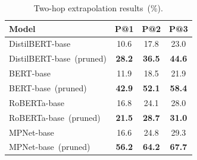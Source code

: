\begin{table}[th!]
	\centering
	\scriptsize
	\begin{tabular}{l|ccc}
		\toprule
		\textbf{Model} &  \textbf{P@1} &  \textbf{P@2} &  \textbf{P@3}\\
		\midrule
		DistilBERT-base &10.6 &17.8 &23.0\\
		DistilBERT-base~(pruned) &\textbf{28.2}  &\textbf{36.5} &\textbf{44.6} \\
		\midrule
		BERT-base &11.9  &18.5 &21.9\\
		BERT-base~(pruned) &\textbf{42.9}  &\textbf{52.1} &\textbf{58.4} \\
		\midrule
		RoBERTa-base &16.8 &24.1 &28.0  \\
		RoBERTa-base~(pruned) &\textbf{21.5}  &\textbf{28.7} &\textbf{31.0}\\
		\midrule
		MPNet-base &16.6 &24.8 &29.3 \\
		MPNet-base~(pruned) &\textbf{56.2} &\textbf{64.2} &\textbf{67.7} \\
		\bottomrule
	\end{tabular}
	\caption{Two-hop extrapolation results~(\%).}
	\label{table:twohop}
\end{table}


